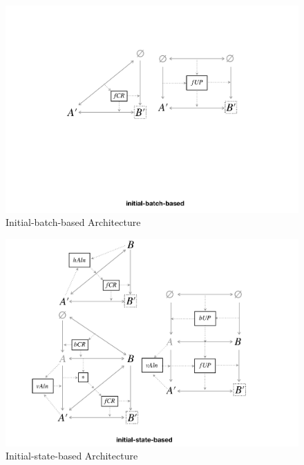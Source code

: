 \begin{figure}[tb!]
	\centering
	\includegraphics[width=0.8\columnwidth]{diagrams/initial-batch-based}
	\caption{Initial-batch-based Architecture}
	\label{fig:initialBatchBased}
\end{figure}

\begin{figure}[tb!]
	\centering
	\includegraphics[width=\columnwidth]{diagrams/initial-state-based}
	\caption{Initial-state-based Architecture}
	\label{fig:initialStateBased}
\end{figure}

